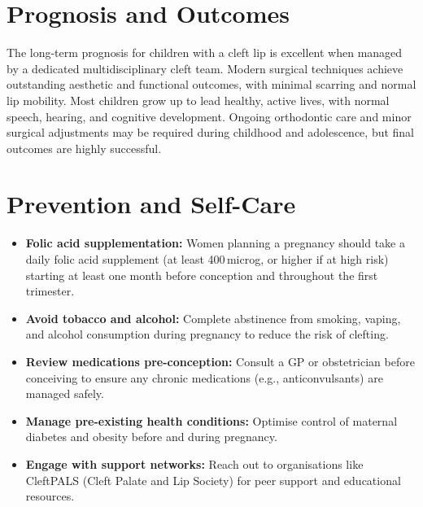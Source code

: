 \section*{Prognosis and Outcomes}
The long-term prognosis for children with a cleft lip is excellent when managed by a dedicated multidisciplinary cleft team. Modern surgical techniques achieve outstanding aesthetic and functional outcomes, with minimal scarring and normal lip mobility. Most children grow up to lead healthy, active lives, with normal speech, hearing, and cognitive development. Ongoing orthodontic care and minor surgical adjustments may be required during childhood and adolescence, but final outcomes are highly successful.

\section*{Prevention and Self-Care}
\begin{itemize}
    \item \textbf{Folic acid supplementation:} Women planning a pregnancy should take a daily folic acid supplement (at least 400\,microg, or higher if at high risk) starting at least one month before conception and throughout the first trimester.
    \item \textbf{Avoid tobacco and alcohol:} Complete abstinence from smoking, vaping, and alcohol consumption during pregnancy to reduce the risk of clefting.
    \item \textbf{Review medications pre-conception:} Consult a GP or obstetrician before conceiving to ensure any chronic medications (e.g., anticonvulsants) are managed safely.
    \item \textbf{Manage pre-existing health conditions:} Optimise control of maternal diabetes and obesity before and during pregnancy.
    \item \textbf{Engage with support networks:} Reach out to organisations like CleftPALS (Cleft Palate and Lip Society) for peer support and educational resources.
\end{itemize}

